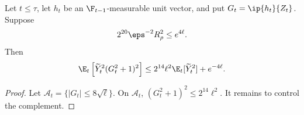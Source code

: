 \begin{lemma}
    \label{lem:ctr-score-localisation}
    Let $t\leq\tau$, let $h_t$ be an $\F_{t-1}$-measurable unit vector, and
    put $G_t=\ip{h_t}{Z_t}$.  Suppose
    \begin{align}
        2^{20}\eps^{-2}R_\rho^2\leq e^{4\ell}.
        \label{eq:ctr-score-tail-parameter}
    \end{align}
    Then
    \begin{align}
        \E_t\left[
            \widetilde Y_t^2(G_t^2+1)^2
            \right]
        \leq2^{14}\ell^2\E_t[\widetilde Y_t^2]+e^{-4\ell}.
        \label{eq:ctr-score-localisation}
    \end{align}
\end{lemma}

\begin{proof}
    Let $\mathcal A_t=\{|G_t|\leq8\sqrt\ell\}$.  On $\mathcal A_t$,
    $(G_t^2+1)^2\leq2^{14}\ell^2$.  It remains to control the complement.


\end{proof}

